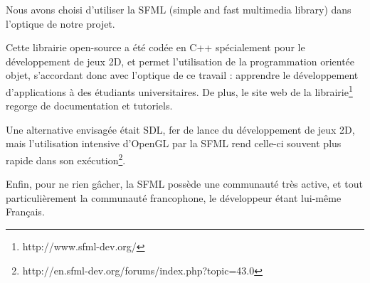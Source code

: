Nous avons choisi d'utiliser la SFML (simple and fast multimedia library) dans l'optique de notre projet. 

Cette librairie open-source a été codée en C++ spécialement pour le développement de jeux 2D, et permet l'utilisation de la programmation orientée objet, s'accordant donc avec l'optique de ce travail : apprendre le développement d'applications à des étudiants universitaires. De plus, le site web de la librairie\footnote{http://www.sfml-dev.org/} regorge de documentation et tutoriels.

Une alternative envisagée était SDL, fer de lance du développement de jeux 2D, mais l'utilisation intensive d'OpenGL par la SFML rend celle-ci souvent plus rapide dans son exécution\footnote{http://en.sfml-dev.org/forums/index.php?topic=43.0}.

Enfin, pour ne rien gâcher, la SFML possède une communauté très active, et tout particulièrement la communauté francophone, le développeur étant lui-même Français.